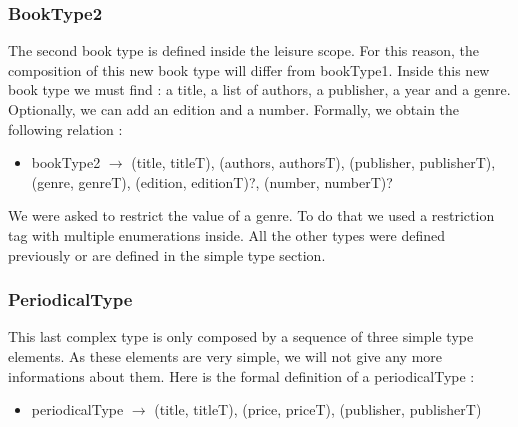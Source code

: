 \documentclass{article}
\begin{document}
\subsubsection{BookType2}
The second book type is defined inside the leisure scope. For this reason, the composition of this new book type will differ from bookType1. Inside this new book type we must find : a title, a list of authors, a publisher, a year and a genre. Optionally, we can add  an edition and a number. Formally, we obtain the following relation :
\begin{itemize}
\item bookType2 $\rightarrow$ (title, titleT), (authors, authorsT), (publisher, publisherT), (genre, genreT), (edition, editionT)?, (number, numberT)?
\end{itemize}
We were asked to restrict the value of a genre. To do that we used a restriction tag with multiple enumerations inside. All the other types were defined previously or are defined in the simple type section.
\subsubsection{PeriodicalType}
This last complex type is only composed by a sequence of three simple type elements. As these elements are very simple, we will not give any more informations about them. Here is the formal definition of a periodicalType :
\begin{itemize}
\item periodicalType $\rightarrow$ (title, titleT), (price, priceT), (publisher, publisherT)
\end{itemize}
\end{document}

